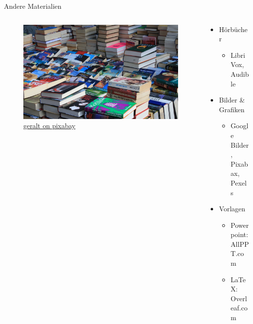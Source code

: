 \documentclass[aspectratio=169,shownotes]{beamer}
\begin{document}
\begin{frame}{Andere Materialien}
    \begin{columns}[t]
        \begin{column}{0.39\textwidth}      
            \vspace{-2em} 
            \begin{figure}[t]
                \begin{flushleft}
                    \includegraphics[height=0.8\textheight,trim={11cm 0 15cm 0},clip]{graphics/Flohmarkt.jpg}         
                    \caption*{\href{https://pixabay.com/de/photos/flohmarkt-bücher-kiste-stöbern-237460/}{geralt on pixabay}}    
                \end{flushleft}
            \end{figure}
        \end{column}          
        \begin{column}{0.69\textwidth}
            \begin{itemize}
                \item Hörbücher
                \begin{itemize}
                    \item LibriVox, Audible 
                \end{itemize}
                \item Bilder \& Grafiken
                \begin{itemize}
                    \item Google Bilder, Pixabax, Pexels
                \end{itemize}
                \item Vorlagen
                \begin{itemize}
                    \item Powerpoint: AllPPT.com
                    \item \LaTeX: Overleaf.com
                \end{itemize}

            \end{itemize}           
        \end{column}        
    \end{columns}    
\end{frame}
\end{document}
